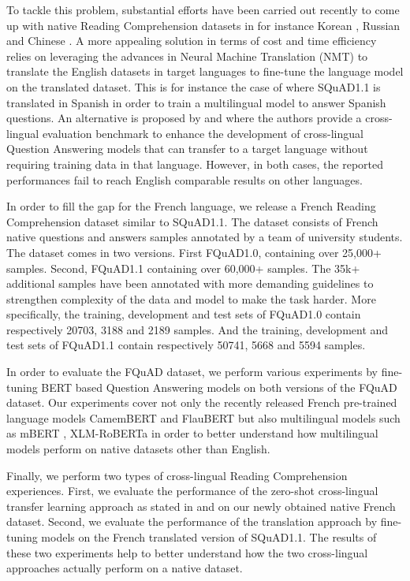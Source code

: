 \documentclass{article}
\begin{document}
To tackle this problem, substantial efforts have been carried out recently to come up with native Reading Comprehension datasets in for instance Korean \citep{lim2019korquad10}, Russian \citep{efimov2019sberquad} and Chinese \citep{cui-etal-2019-span}. 
A more appealing solution in terms of cost and time efficiency relies on leveraging the advances in Neural Machine Translation (NMT) to translate the English datasets in target languages to fine-tune the language model on the translated dataset.
This is for instance the case of \citeauthor{spanishsquad} where SQuAD1.1 is translated in Spanish in order to train a multilingual model to answer Spanish questions.
An alternative is proposed by \citep{xquad} and \citep{mlqa} where the authors provide a cross-lingual evaluation benchmark to enhance the development of cross-lingual Question Answering models that can transfer to a target language without requiring training data in that language.
However, in both cases, the reported performances fail to reach English comparable results on other languages.

In order to fill the gap for the French language, we release a French Reading Comprehension dataset similar to SQuAD1.1.
The dataset consists of French native questions and answers samples annotated by a team of university students. 
The dataset comes in two versions. 
First FQuAD1.0, containing over 25,000+ samples. 
Second, FQuAD1.1 containing over 60,000+ samples. 
The 35k+ additional samples have been annotated with more demanding guidelines to strengthen complexity of the data and model to make the task harder.
More specifically, the training, development and test sets of FQuAD1.0 contain respectively 20703, 3188 and 2189 samples.
And the training, development and test sets of FQuAD1.1 contain respectively 50741, 5668 and 5594 samples.

In order to evaluate the FQuAD dataset, we perform various experiments by fine-tuning BERT based Question Answering models on both versions of the FQuAD dataset.
Our experiments cover not only the recently released French pre-trained language models CamemBERT \citep{camembert} and FlauBERT \citep{flaubert} but also multilingual models such as mBERT \citep{multilingual-bert}, XLM-RoBERTa \citep{xlmr} in order to better understand how multilingual models perform on native datasets other than English.

Finally, we perform two types of cross-lingual Reading Comprehension experiences.
First, we evaluate the performance of the zero-shot cross-lingual transfer learning approach as stated in \citep{xquad} and \citep{mlqa} on our newly obtained native French dataset. 
Second, we evaluate the performance of the translation approach by fine-tuning models on the French translated version of SQuAD1.1.
The results of these two experiments help to better understand how the two cross-lingual approaches actually perform on a native dataset.
 
\end{document}
